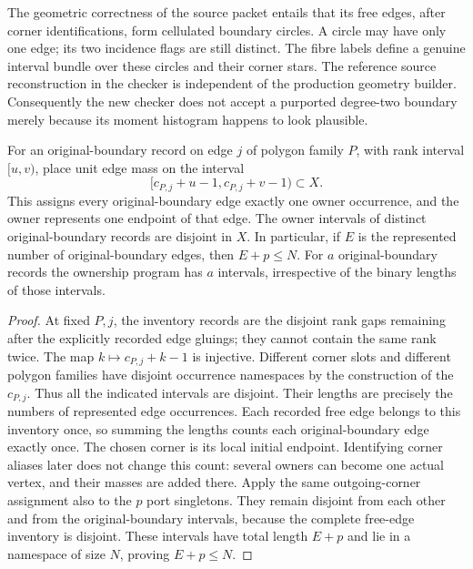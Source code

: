 The geometric correctness of the source packet entails that its free edges,
after corner identifications, form cellulated boundary circles.  A circle
may have only one edge; its two incidence flags are still distinct.  The
fibre labels define a genuine interval bundle over these circles and their
corner stars.  The reference source reconstruction in the checker is
independent of the production geometry builder.  Consequently the new
checker does not accept a purported degree-two boundary merely because its
moment histogram happens to look plausible.

\begin{lemma}
\label{lem:native-edge-ownership}
For an original-boundary record on edge $j$ of polygon family $P$, with
rank interval $[u,v)$, place unit edge mass on the interval
\[
                 [c_{P,j}+u-1,c_{P,j}+v-1)\subset X.
\]
This assigns every original-boundary edge exactly one owner occurrence,
and the owner represents one endpoint of that edge.  The owner intervals
of distinct original-boundary records are disjoint in $X$.  In particular,
if $E$ is the represented number of original-boundary edges, then
$E+p\leq N$.
For $a$ original-boundary records the ownership program has $a$ intervals,
irrespective of the binary lengths of those intervals.
\end{lemma}

\begin{proof}
At fixed $P,j$, the inventory records are the disjoint rank gaps remaining
after the explicitly recorded edge gluings; they cannot contain the same
rank twice.  The map $k\mapsto c_{P,j}+k-1$ is injective.  Different corner
slots and different polygon families have disjoint occurrence namespaces
by the construction of the $c_{P,j}$.  Thus all the indicated intervals
are disjoint.  Their lengths are precisely the numbers of represented
edge occurrences.  Each recorded free edge belongs to this inventory once,
so summing the lengths counts each original-boundary edge exactly once.
The chosen corner is its local initial endpoint.  Identifying corner
aliases later does not change this count: several owners can become one
actual vertex, and their masses are added there.  Apply the same outgoing-corner assignment also to the $p$ port singletons.
They remain disjoint from each other and from the original-boundary
intervals, because the complete free-edge inventory is disjoint.  These
intervals have total length $E+p$ and lie in a namespace of size $N$,
proving $E+p\leq N$.
\end{proof}

